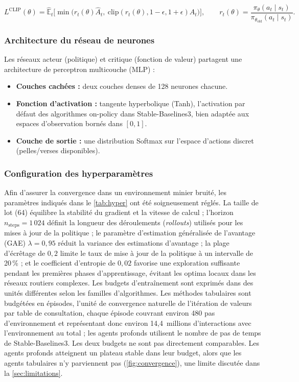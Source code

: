 \documentclass[11pt,a4paper]{article}
\begin{document}
\begin{equation}
L^{\mathrm{CLIP}}(\theta) = \hat{\mathbb{E}}_t \Big[ \min \big( r_t(\theta)\hat{A}_t,\ \mathrm{clip}(r_t(\theta), 1-\epsilon, 1+\epsilon)\hat{A}_t \big) \Big],
\qquad r_t(\theta) = \frac{\pi_\theta(a_t \mid s_t)}{\pi_{\theta_{\mathrm{old}}}(a_t \mid s_t)} .
\end{equation}

\subsubsection{Architecture du réseau de neurones}

Les réseaux acteur (politique) et critique (fonction de valeur) partagent une architecture de perceptron multicouche (MLP) :

\begin{itemize}
  \item \textbf{Couches cachées :} deux couches denses de 128 neurones chacune.
  \item \textbf{Fonction d'activation :} tangente hyperbolique (Tanh), l'activation par défaut des algorithmes on-policy dans Stable-Baselines3, bien adaptée aux espaces d'observation bornés dans $[0,1]$.
  \item \textbf{Couche de sortie :} une distribution Softmax sur l'espace d'actions discret (pelles/verses disponibles).
\end{itemize}

\subsubsection{Configuration des hyperparamètres}

Afin d'assurer la convergence dans un environnement minier bruité, les paramètres indiqués dans le \cref{tab:hyper} ont été soigneusement réglés. La taille de lot (64) équilibre la stabilité du gradient et la vitesse de calcul ; l'horizon $n_{\mathrm{steps}} = 1\,024$ définit la longueur des déroulements (\textit{rollouts}) utilisés pour les mises à jour de la politique ; le paramètre d'estimation généralisée de l'avantage (GAE) $\lambda = 0{,}95$ réduit la variance des estimations d'avantage ; la plage d'écrêtage de $0{,}2$ limite le taux de mise à jour de la politique à un intervalle de 20\,\% ; et le coefficient d'entropie de $0{,}02$ favorise une exploration suffisante pendant les premières phases d'apprentissage, évitant les optima locaux dans les réseaux routiers complexes. Les budgets d'entraînement sont exprimés dans des unités différentes selon les familles d'algorithmes. Les méthodes tabulaires sont budgétées en épisodes, l'unité de convergence naturelle de l'itération de valeurs par table de consultation, chaque épisode couvrant environ 480 pas d'environnement et représentant donc environ 14,4~millions d'interactions avec l'environnement au total ; les agents profonds utilisent le nombre de pas de temps de Stable-Baselines3. Les deux budgets ne sont pas directement comparables. Les agents profonds atteignent un plateau stable dans leur budget, alors que les agents tabulaires n'y parviennent pas (\cref{fig:convergence}), une limite discutée dans la \cref{sec:limitations}.
\end{document}
